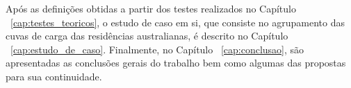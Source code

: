 Após as definições obtidas a partir dos testes realizados no Capítulo ~\ref{cap:testes_teoricos}, o estudo de caso em si, que consiste no agrupamento das cuvas de carga das residências australianas, é descrito no Capítulo ~\ref{cap:estudo_de_caso}. Finalmente, no Capítulo ~\ref{cap:conclusao}, são apresentadas as conclusões gerais do trabalho bem como algumas das propostas para sua continuidade.
